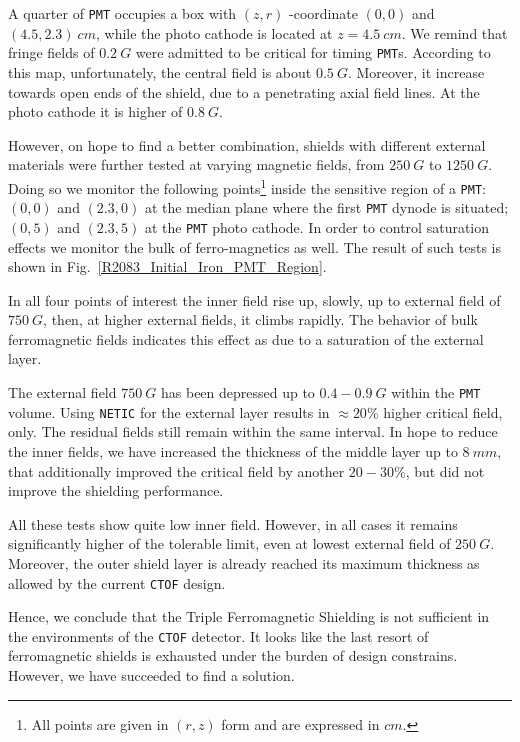 \documentclass[12pt]{article}
\begin{document}
A quarter of {\tt PMT}  occupies a box with $(z,r)$
-coordinate $(0,0)$ and $(4.5,2.3)~cm$,  
while the  photo cathode is located at  $z=4.5~cm$. 
We remind that   fringe  fields  of  $0.2~G$ were 
admitted to be critical  for  timing {\tt PMT}s. 
According to this map, unfortunately,  the central  
field is  about $0.5~G$. 
Moreover,  it  increase towards   open ends of the shield, due to a
penetrating  axial field lines. At the photo cathode it is
higher of $0.8~G$.  


However, on hope to find a better combination, shields 
with different  external materials were further 
tested at varying magnetic fields, from $250~G$ to $1250~G$.
Doing so we  monitor the following  
points\footnote{All points are given in $(r,z)$ form and are 
expressed in $cm$.} 
inside the sensitive region of a {\tt PMT}:$(0,0)$ and $(2.3,0)$ 
at  the median plane where the  first {\tt PMT} dynode is situated;
$(0,5)$ and $(2.3,5)$ at  the {\tt PMT} photo cathode.
In order to control  saturation effects we monitor 
the bulk of ferro-magnetics as well.
The result of such tests is shown in 
Fig.~\ref{R2083_Initial_Iron_PMT_Region}.

In all four points of interest  the inner field  rise  up, 
slowly, up to external field of  $750~G$, 
then, at higher external fields, 
it climbs rapidly. The behavior of
bulk ferromagnetic fields indicates this effect 
as due to a  saturation of the external  layer. 

The  external  field  $750~G$ has been  depressed up 
to $0.4-0.9~G$ within the {\tt PMT} volume. 
Using  {\tt NETIC} for the  external layer results in $\approx20\%$ 
higher critical field, only.  
The  residual fields  still remain within the same interval.
In hope to reduce the inner fields, we have increased 
the thickness of the middle layer up to $8~mm$, 
that additionally  improved the critical field by another $20-30\%$,
but did not improve the shielding performance.

All these tests show 
quite low inner field. However, in all cases it  remains  
significantly  higher of the  tolerable limit,   even 
at  lowest external field of $250~G$.  
Moreover, the outer shield layer is already  reached  its maximum 
thickness as allowed by the current {\tt CTOF} design.
  

Hence, we conclude that  the  Triple Ferromagnetic Shielding  is  not  
sufficient  in the environments of the {\tt CTOF} detector.
It looks like  the last resort of ferromagnetic shields is  
exhausted  under the 
burden of design constrains.
However, we have succeeded to  find a solution.
 
\end{document}
